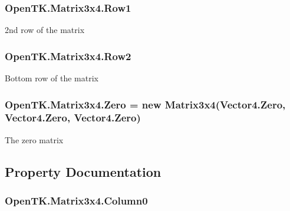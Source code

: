 \hypertarget{struct_open_t_k_1_1_matrix3x4_a1389c564fa76be3c934f6eda4604e76a}{
\subsubsection[{Row1}]{ Open\-T\-K.\-Matrix3x4.\-Row1}}\label{struct_open_t_k_1_1_matrix3x4_a1389c564fa76be3c934f6eda4604e76a}


2nd row of the matrix 

\hypertarget{struct_open_t_k_1_1_matrix3x4_a1ca39713a5c98f912081b57f23f3b90c}{
\subsubsection[{Row2}]{ Open\-T\-K.\-Matrix3x4.\-Row2}}\label{struct_open_t_k_1_1_matrix3x4_a1ca39713a5c98f912081b57f23f3b90c}


Bottom row of the matrix 

\hypertarget{struct_open_t_k_1_1_matrix3x4_a3d510f6ca496df802ced6cf0bd612888}{
\subsubsection[{Zero}]{ Open\-T\-K.\-Matrix3x4.\-Zero = new {\bf Matrix3x4}(Vector4.\-Zero, Vector4.\-Zero, Vector4.\-Zero)\hspace{0.3cm}{\ttfamily [static]}}}\label{struct_open_t_k_1_1_matrix3x4_a3d510f6ca496df802ced6cf0bd612888}


The zero matrix 



\subsection{Property Documentation}
\hypertarget{struct_open_t_k_1_1_matrix3x4_abc877b3396743cb7733542d88028a746}{
\subsubsection[{Column0}]{ Open\-T\-K.\-Matrix3x4.\-Column0\hspace{0.3cm}{\ttfamily [get]}}}\label{struct_open_t_k_1_1_matrix3x4_abc877b3396743cb7733542d88028a746}


